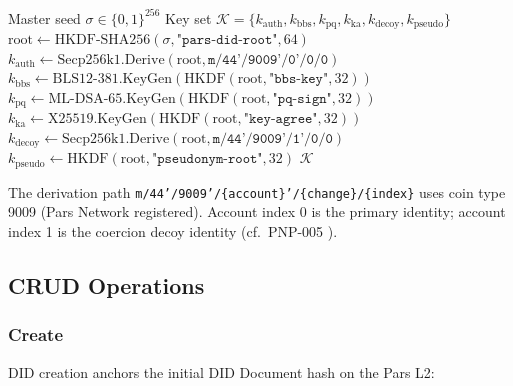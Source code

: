 \documentclass[11pt,a4paper]{article}
\begin{document}
\begin{algorithm}[H]
\caption{Pars DID Key Derivation}
\label{alg:key-derivation}
\begin{algorithmic}[1]
\Require Master seed $\sigma \in \{0,1\}^{256}$
\Ensure Key set $\mathcal{K} = \{k_{\text{auth}}, k_{\text{bbs}}, k_{\text{pq}}, k_{\text{ka}}, k_{\text{decoy}}, k_{\text{pseudo}}\}$
\State $\text{root} \gets \text{HKDF-SHA256}(\sigma, \texttt{"pars-did-root"}, 64)$
\State $k_{\text{auth}} \gets \text{Secp256k1.Derive}(\text{root}, \texttt{m/44'/9009'/0'/0/0})$
\State $k_{\text{bbs}} \gets \text{BLS12-381.KeyGen}(\text{HKDF}(\text{root}, \texttt{"bbs-key"}, 32))$
\State $k_{\text{pq}} \gets \text{ML-DSA-65.KeyGen}(\text{HKDF}(\text{root}, \texttt{"pq-sign"}, 32))$
\State $k_{\text{ka}} \gets \text{X25519.KeyGen}(\text{HKDF}(\text{root}, \texttt{"key-agree"}, 32))$
\State $k_{\text{decoy}} \gets \text{Secp256k1.Derive}(\text{root}, \texttt{m/44'/9009'/1'/0/0})$
\State $k_{\text{pseudo}} \gets \text{HKDF}(\text{root}, \texttt{"pseudonym-root"}, 32)$
\State \Return $\mathcal{K}$
\end{algorithmic}
\end{algorithm}

The derivation path \texttt{m/44'/9009'/\{account\}'/\{change\}/\{index\}} uses
coin type 9009 (Pars Network registered). Account index 0 is the primary identity;
account index 1 is the coercion decoy identity (cf.\ PNP-005 \cite{pnp005}).

\subsection{CRUD Operations}

\subsubsection{Create}

DID creation anchors the initial DID Document hash on the Pars L2:
\end{document}
